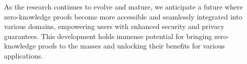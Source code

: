 As the research continues to evolve and mature, we anticipate a future where zero-knowledge proofs become more accessible and seamlessly integrated into various domains, empowering users with enhanced security and privacy guarantees. This development holds immense potential for bringing zero-knowledge proofs to the masses and unlocking their benefits for various applications.





